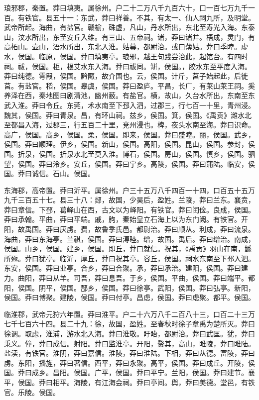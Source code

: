 \documentclass[12pt,UTF8]{ctexbook}
\begin{document}
琅邪郡，秦置。莽曰填夷。属徐州。户二十二万八千九百六十，口一百七万九千一百。有铁官。县五十一：东武，莽曰祥善。不其，有太一、仙人祠九所，及明堂。武帝所起。海曲，有盐官。赣榆，硃虚，凡山，丹水所出，东北至寿光入海。东泰山，汶水所出，东至安丘入维。有三山、五帝祠。诸，莽曰诸并。梧成，灵门，有高柘山。壶山，浯水所出，东北入淮。姑幕，都尉治。或曰薄姑。莽曰季睦。虚水，侯国。临原，侯国。莽曰填夷亭。琅邪，越王句践尝治此，起馆台。有四时祠。祓，侯国。柜，根艾水东入海。莽曰祓同。缾，侯国。，胶水东至平度入海。莽曰纯德。雩叚，侯国。黔陬，故介国也。云，侯国。计斤，莒子始起此，后徙莒。有盐官。稻，侯国。皋虞，侯国。莽曰盈庐。平昌，长广，有莱山莱王祠。奚养泽在西，秦地图曰剧清池，幽州薮。有盐官。横，故山，久台水所出，东南至东武入淮。莽曰令丘。东莞，术水南至下邳入泗，过郡三，行七百一十里，青州浸。魏其，侯国。莽曰青泉。昌，有环山祠。兹乡，侯国。箕，侯国。《禹贡》潍水北至都昌入海，过郡三，行五百二十里，兗州浸也。椑，夜头水南至海。莽曰识命。高广，侯国。高乡，侯国。柔，侯国。即来，侯国。莽曰盛睦。丽，侯国。武乡，侯国。莽曰顺理。伊乡，侯国。新山，侯国。高阳，侯国。昆山，侯国。参封，侯国。折泉，侯国。折泉水北至莫入淮。博石，侯国。房山，侯国。慎乡，侯国。驷望，侯国。莽曰泠乡。安丘，侯国。莽曰宁乡。高陵，侯国。莽曰蒲陆。临安，侯国。莽曰诚信。石山。侯国。



东海郡，高帝置。莽曰沂平。属徐州。户三十五万八千四百一十四，口百五十五万九千三百五十七。县三十八：郯，故国，少昊后，盈姓。兰陵，莽曰兰东。襄贲，莽曰章信。下邳，葛峄山在西，古文以为峄阳。有铁官。莽曰闰俭。良成，侯国。莽曰承翰。平曲，莽曰平端。戚，朐，秦始皇立石海上以为东门阙。有铁官。开阳，故禹国。莽曰厌虏。费，故鲁季氏邑。都尉治。莽曰顺从。利成，莽曰流泉。海曲，莽曰东海亭。兰祺，侯国。莽曰溥睦。缯，故国。禹后。莽曰缯治。南成，侯国。山乡，侯国。建乡，侯国。即丘，莽曰就信。祝其，《禹贡》羽山在南，鲧所殛。莽曰犹亭。临沂，厚丘，莽曰祝其亭。容丘，侯国。祠水东南至下邳入泗。东安，侯国。莽曰业亭。合乡，莽曰合聚。承，莽曰承治。建阳，侯国。莽曰建力。曲阳，莽曰从羊。司吾，莽曰息吾。于乡，侯国。平曲，侯国。莽曰端平。都阳，侯国。阴平，侯国。郚乡，侯国。莽曰徐亭。武阳，侯国。莽曰弘亭。新阳，侯国。莽曰博聚。建陵，侯国。莽曰付亭。昌虑，侯国。莽曰虑聚。都平。侯国。



临淮郡，武帝元狩六年置。莽曰淮平。户二十六万八千二百八十三，口百二十三万七千七百六十四。县二十九：徐，故国，盈姓。至春秋时徐子章禹为楚所灭。莽曰徐调。取虑，淮浦，游水北入海。莽曰淮敬。盱眙，都尉治。莽曰武匡。犹，莽曰秉义。僮，莽曰成信。射阳。莽曰监淮亭。开阳，赘其，高山，睢陵，莽曰睢陆。盐渎，有铁官。淮阴，莽曰嘉信。淮陵，莽曰淮陆。下相，莽曰从德。富陵，莽曰虏。东阳，播旌，莽曰著信。西平，莽曰永聚。高平，侯国。莽曰成丘。开陵，侯国。莽曰成乡。昌阳。侯国。广平，侯国。莽曰平宁。兰阳，侯国。莽曰建节。襄平，侯国。莽曰相平。海陵，有江海会祠。莽曰亭间。舆，莽曰美德。堂邑，有铁官。乐陵。侯国。
\end{document}

